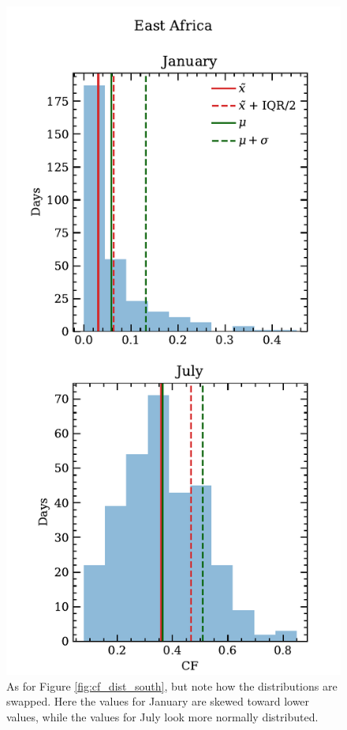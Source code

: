 \begin{figure}
  \centering
  \includegraphics[width=0.8\linewidth]{figures/cf_monthly_dist_eastafrica}
  \caption{As for Figure \ref{fig:cf_dist_south}, but note how the
    distributions are swapped. Here the values for January are skewed
    toward lower values, while the values for July look more normally
    distributed.}
  \label{fig:cf_dist_east}
\end{figure}

